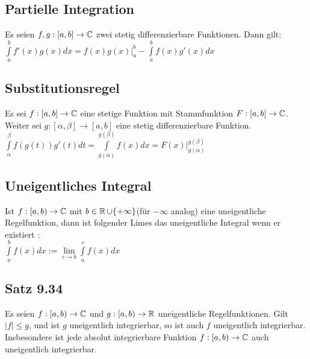 \documentclass[german]{latex4ei/latex4ei_sheet}
\begin{document}
\begin{sectionbox}
	\subsection{Partielle Integration}
	Es seien $f,g : [a,b] \rightarrow \mathbb C$ zwei stetig differenzierbare Funktionen. Dann gilt:\\
$	\int \limits_a^b f'(x)g(x)dx = \left.f(x)g(x) \right|_a^b - \int \limits_a^b f(x)g'(x)dx$

\end{sectionbox}

\begin{sectionbox}
	\subsection{Substitutionsregel}
	Es sei $f : [a,b] \rightarrow \mathbb C$ eine stetige Funktion mit Stammfunktion $F : [a,b] \rightarrow \mathbb C$. Weiter sei $g : [\alpha,\beta] \rightarrow [a,b]$ eine stetig differenzierbare Funktion.\\
	$\int \limits_\alpha^\beta f(g(t))g'(t)dt = \int \limits_{g(\alpha)}^{g(\beta)} f(x)dx = \left.F(x) \right|_{g(\alpha)}^{g(\beta)} $



\end{sectionbox}

\begin{sectionbox}
	\subsection{Uneigentliches Integral}
	Ist $f : [a,b) \rightarrow \mathbb C$ mit $b \in  \operatorname{\mathbb R} \cup \{+ \infty\}$(für $-\infty$ analog) eine uneigentliche Regelfunktion,  dann ist folgender Limes das uneigentliche Integral wenn er existiert :\\
	$\int \limits_a^b f(x)dx := \lim \limits_{c \to b} \int \limits_a^c f(x)dx$


\end{sectionbox}

\begin{sectionbox}
	\subsection{Satz  9.34}
	Es seien $f : [a, b) \rightarrow \mathbb C$ und $g : [a, b) \rightarrow \operatorname{\mathbb R}$ uneigentliche Regelfunktionen. Gilt $|f| \le  g$, und ist $g$ uneigentlich integrierbar, so ist auch $f$ uneigentlich integrierbar. Insbesondere ist jede absolut integrierbare Funktion $f : [a, b) \rightarrow \mathbb C$ auch uneigentlich integrierbar.

\end{sectionbox}
\end{document}
